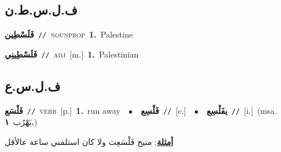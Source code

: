 \documentclass[10pt,a4paper,twoside]{article} %
\begin{document}
\begin{multicols}{2}
\vspace{-3mm}
\subsection*{\color{blue}\foreignlanguage{arabic}{ف.ل.س.ط.ن}\color{blue}{ (ntws)}} 

{\setlength\topsep{0pt}\textbf{\foreignlanguage{arabic}{فَلَسْطِين}}\ {\color{gray}\texttt{//}\color{black}}\ \textsc{noun\textunderscore prop}\ \textbf{1.}~Palestine\ } \vspace{2mm}

{\setlength\topsep{0pt}\textbf{\foreignlanguage{arabic}{فَلَسْطِينِي}}\ {\color{gray}\texttt{//}\color{black}}\ \textsc{adj}\ [m.]\ \textbf{1.}~Palestinian\ } \vspace{2mm}

\vspace{-3mm}
\subsection*{\color{blue}\foreignlanguage{arabic}{ف.ل.س.ع}\color{blue}{}} 

{\setlength\topsep{0pt}\textbf{\foreignlanguage{arabic}{فَلْسَع}}\ {\color{gray}\texttt{//}\color{black}}\ \textsc{verb}\ [p.]\ \textbf{1.}~run away\ \ $\bullet$\ \ \setlength\topsep{0pt}\textbf{\foreignlanguage{arabic}{فَلْسِع}}\ {\color{gray}\texttt{//}\color{black}}\ [c.]\ \ $\bullet$\ \ \setlength\topsep{0pt}\textbf{\foreignlanguage{arabic}{يفَلْسِع}}\ {\color{gray}\texttt{//}\color{black}}\ [i.]\ \color{gray}(msa. \foreignlanguage{arabic}{يَهْرُب}~\foreignlanguage{arabic}{\textbf{١.}})\color{black}\  \begin{flushright}\color{gray}\foreignlanguage{arabic}{\textbf{\underline{\foreignlanguage{arabic}{أمثلة}}}: منيح فَلْسَعِت ولا كان استلمني ساعة عالأقل}\end{flushright}\color{black}} \vspace{2mm}


\end{multicols}
\end{document}
